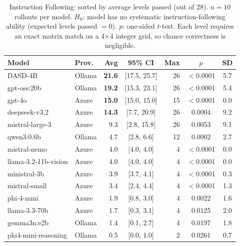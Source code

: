 \documentclass[11pt,a4paper]{article}
\begin{document}
\begin{table}[h]
\centering
\caption{Instruction Following: sorted by average levels passed (out of 28). $n = 10$ rollouts per model. $H_0$: model has no systematic instruction-following ability (expected levels passed $= 0$). $p$: one-sided $t$-test. Each level requires an exact matrix match on a 4$\times$4 integer grid, so chance correctness is negligible.}
\vspace{4pt}
\small
\begin{tabular}{@{}llrcrcc@{}}
\toprule
\textbf{Model} & \textbf{Prov.} & \textbf{Avg} & \textbf{95\% CI} & \textbf{Max} & \textbf{$p$} & \textbf{SD} \\
\midrule
DASD-4B              & Ollama & \textbf{21.6} & [17.5, 25.7] & 26 & $<$0.0001 & 5.7 \\
gpt-oss:20b          & Ollama & \textbf{19.2} & [15.3, 23.1] & 26 & $<$0.0001 & 5.4 \\
gpt-4o               & Azure  & \textbf{15.0} & [15.0, 15.0] & 15 & $<$0.0001 & 0.0 \\
deepseek-v3.2        & Azure  & \textbf{14.3} & [\phantom{0}7.7, 20.9] & 26 & 0.0004 & 9.2 \\
mistral-large-3      & Azure  & 9.3           & [\phantom{0}2.8, 15.8] & 26 & 0.0053 & 9.1 \\
qwen3:0.6b           & Ollama & 4.7           & [\phantom{0}2.8, \phantom{0}6.6] & 12 & 0.0002 & 2.7 \\
mistral-nemo         & Azure  & 4.0           & [\phantom{0}4.0, \phantom{0}4.0] & 4  & $<$0.0001 & 0.0 \\
llama-3.2-11b-vision & Azure  & 4.0           & [\phantom{0}4.0, \phantom{0}4.0] & 4  & $<$0.0001 & 0.0 \\
ministral-3b         & Azure  & 3.9           & [\phantom{0}3.7, \phantom{0}4.1] & 4  & $<$0.0001 & 0.3 \\
mistral-small        & Azure  & 3.4           & [\phantom{0}2.4, \phantom{0}4.4] & 4  & $<$0.0001 & 1.3 \\
phi-4-mini           & Azure  & 1.9           & [\phantom{0}0.8, \phantom{0}3.0] & 4  & 0.0022 & 1.6 \\
llama-3.3-70b        & Azure  & 1.7           & [\phantom{0}0.3, \phantom{0}3.1] & 4  & 0.0125 & 2.0 \\
gemma3n:e2b          & Ollama & 1.4           & [\phantom{0}0.1, \phantom{0}2.7] & 4  & 0.0197 & 1.8 \\
phi4-mini-reasoning  & Ollama & 0.5           & [\phantom{-}0.0, \phantom{0}1.0] & 2  & 0.0261 & 0.7 \\

\end{tabular}
\end{table}
\end{document}
